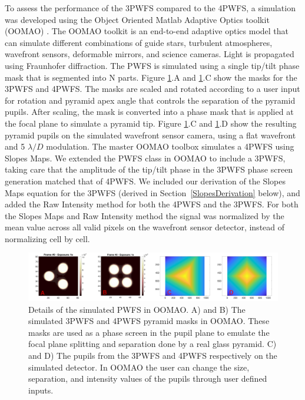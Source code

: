 To assess the performance of the 3PWFS compared to the 4PWFS, a simulation was developed using the Object Oriented Matlab Adaptive Optics toolkit (OOMAO) \citep{OOMAO}. The OOMAO toolkit is an end-to-end adaptive optics model that can simulate different combinations of guide stars, turbulent atmospheres, wavefront sensors, deformable mirrors, and science cameras. Light is propagated using Fraunhofer diffraction. The PWFS is simulated using a single tip/tilt phase mask that is segmented into N parts. Figure \ref{fig:oomaoFigs}.A and \ref{fig:oomaoFigs}.C show the masks for the 3PWFS and 4PWFS. The masks are scaled and rotated according to a user input for rotation and pyramid apex angle that controls the separation of the pyramid pupils. After scaling, the mask is converted into a phase mask that is applied at the focal plane to simulate a pyramid tip. Figure \ref{fig:oomaoFigs}.C and \ref{fig:oomaoFigs}.D show the resulting pyramid pupils on the simulated wavefront sensor camera, using a flat wavefront and 5 $\lambda/D$ modulation. The master OOMAO toolbox simulates a 4PWFS using Slopes Maps. We extended the PWFS class in OOMAO to include a 3PWFS, taking care that the amplitude of the tip/tilt phase in the 3PWFS phase screen generation matched that of 4PWFS. We included our derivation of the Slopes Maps equation for the 3PWFS (derived in Section~\ref{SlopesDerivation} below), and added the Raw Intensity method for both the 4PWFS and the 3PWFS. For both the Slopes Maps and Raw Intensity method the signal was normalized by the mean value across all valid pixels on the wavefront sensor detector, instead of normalizing cell by cell. 

\begin{figure}
    \centering
    \includegraphics[width=1\textwidth]{Chapter Materials/Chapter Two Materials/oomaoFigs.png}
    \caption{Details of the simulated PWFS in OOMAO. A) and B) The simulated 3PWFS and 4PWFS pyramid masks in OOMAO. These masks are used as a phase screen in the pupil plane to emulate the focal plane splitting and separation done by a real glass pyramid. C) and D) The pupils from the 3PWFS and 4PWFS respectively on the simulated detector. In OOMAO the user can change the size, separation, and intensity values of the pupils through user defined inputs.}
    \label{fig:oomaoFigs}
\end{figure}


